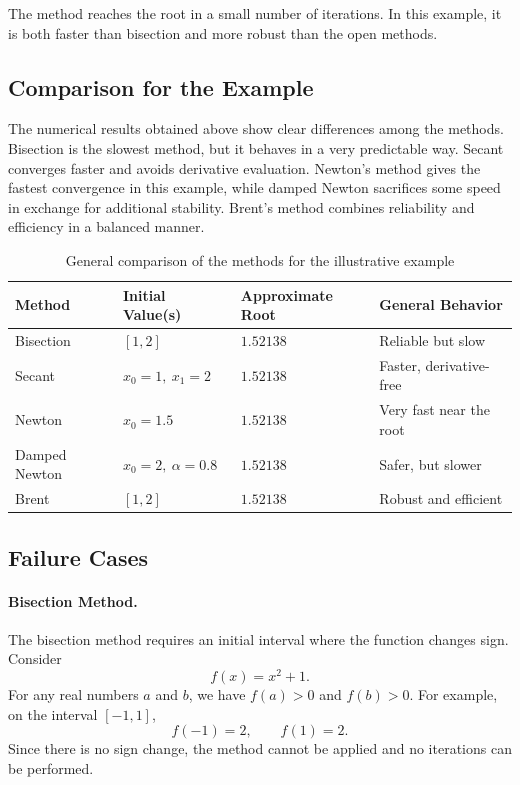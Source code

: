 The method reaches the root in a small number of iterations. In this example, it is both faster than bisection and more robust than the open methods.

\subsection{Comparison for the Example}

The numerical results obtained above show clear differences among the methods. Bisection is the slowest method, but it behaves in a very predictable way. Secant converges faster and avoids derivative evaluation. Newton's method gives the fastest convergence in this example, while damped Newton sacrifices some speed in exchange for additional stability. Brent's method combines reliability and efficiency in a balanced manner.

\begin{table}[h!]
\centering
\caption{General comparison of the methods for the illustrative example}
\label{tab:single_example_comparison}
\begin{tabular}{|l|l|l|l|}
\hline
Method & Initial Value(s) & Approximate Root & General Behavior \\ \hline
Bisection & \([1,2]\) & \(1.52138\) & Reliable but slow \\ \hline
Secant & \(x_0=1,\ x_1=2\) & \(1.52138\) & Faster, derivative-free \\ \hline
Newton & \(x_0=1.5\) & \(1.52138\) & Very fast near the root \\ \hline
Damped Newton & \(x_0=2,\ \alpha=0.8\) & \(1.52138\) & Safer, but slower \\ \hline
Brent & \([1,2]\) & \(1.52138\) & Robust and efficient \\ \hline
\end{tabular}
\end{table}

\subsection{Failure Cases}

\paragraph{Bisection Method.}
The bisection method requires an initial interval where the function changes sign. Consider
\[
f(x) = x^2 + 1.
\]
For any real numbers \(a\) and \(b\), we have \(f(a) > 0\) and \(f(b) > 0\). For example, on the interval \([-1, 1]\),
\[
f(-1) = 2, \qquad f(1) = 2.
\]
Since there is no sign change, the method cannot be applied and no iterations can be performed.

